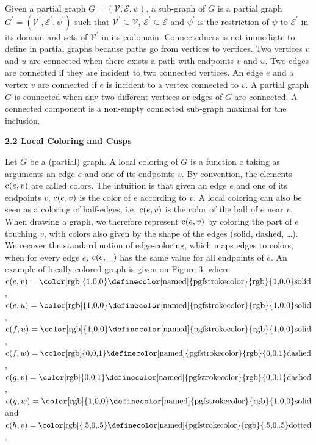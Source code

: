 \documentclass[10pt,a4paper]{amsart}
\begin{document}
 
 
Given a partial graph $G=(\mathcal{V},\mathcal{E},\psi)$, a sub-graph of $G$ is a partial graph $G^{\prime}=(\mathcal{V}^{\prime},\mathcal{E}^{\prime},\psi^{\prime})$ such that $\mathcal{V}^{\prime}\subseteq\mathcal{V}$, $\mathcal{E}^{\prime}\subseteq\mathcal{E}$ and $\psi^{\prime}$ is the restriction of $\psi$ to $\mathcal{E}^{\prime}$ in its domain and sets of $\mathcal{V}^{\prime}$ in its codomain. Connectedness is not immediate to define in partial graphs because paths go from vertices to vertices. Two vertices $v$ and $u$ are connected when there exists a path with endpoints $v$ and $u$. Two edges are connected if they are incident to two connected vertices. An edge $e$ and a vertex $v$ are connected if $e$ is incident to a vertex connected to $v$. A partial graph $G$ is connected when any two different vertices or edges of $G$ are connected. A connected component is a non-empty connected sub-graph maximal for the inclusion.\par
 
 
 
 
\par\medskip\noindent\textbf{2.2 Local Coloring and Cusps}\par
 
 
Let $G$ be a (partial) graph. A local coloring of $G$ is a function c taking as arguments an edge $e$ and one of its endpoints $v$. By convention, the elements $\textnormal{{c}}(e,v)$ are called colors. The intuition is that given an edge $e$ and one of its endpoints $v$, $\textnormal{{c}}(e,v)$ is the color of $e$ according to $v$. A local coloring can also be seen as a coloring of half-edges, i.e. $\textnormal{{c}}(e,v)$ is the color of the half of $e$ near $v$. When drawing a graph, we therefore represent $\textnormal{{c}}(e,v)$ by coloring the part of $e$ touching $v$, with colors also given by the shape of the edges (solid, dashed, …). We recover the standard notion of edge-coloring, which maps edges to colors, when for every edge $e$, $\textnormal{{c}}(e,\_)$ has the same value for all endpoints of $e$. An example of locally colored graph is given on Figure 3, where $\textnormal{{c}}(e,v)=\text{{\color[rgb]{1,0,0}\definecolor[named]{%
pgfstrokecolor}{rgb}{1,0,0}solid}}$, $\textnormal{{c}}(e,u)=\text{{\color[rgb]{1,0,0}\definecolor[named]{%
pgfstrokecolor}{rgb}{1,0,0}solid}}$, $\textnormal{{c}}(f,u)=\text{{\color[rgb]{1,0,0}\definecolor[named]{%
pgfstrokecolor}{rgb}{1,0,0}solid}}$, $\textnormal{{c}}(f,w)=\text{{\color[rgb]{0,0,1}\definecolor[named]{%
pgfstrokecolor}{rgb}{0,0,1}dashed}}$, $\textnormal{{c}}(g,v)=\text{{\color[rgb]{0,0,1}\definecolor[named]{%
pgfstrokecolor}{rgb}{0,0,1}dashed}}$, $\textnormal{{c}}(g,w)=\text{{\color[rgb]{1,0,0}\definecolor[named]{%
pgfstrokecolor}{rgb}{1,0,0}solid}}$ and $\textnormal{{c}}(h,v)=\text{{\color[rgb]{.5,0,.5}\definecolor[named]{%
pgfstrokecolor}{rgb}{.5,0,.5}dotted}}$.\par
 
\end{document}
